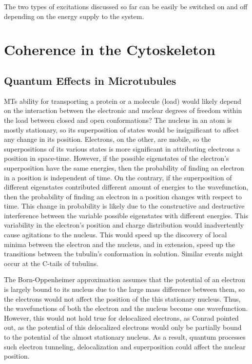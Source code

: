 \documentclass[letterpaper,final,times]{cas-dc}
\numberwithin{equation}{section}
\begin{document}
The two types of excitations discussed so far can be easily be switched on and off depending on the energy supply to the system.

\section{Coherence in the Cytoskeleton}
\subsection{Quantum Effects in Microtubules}
MTs ability for transporting a protein or a molecule (load) would likely depend on the interaction between the electronic and nuclear degrees of freedom within the load between closed and open conformations? The nucleus in an atom is mostly stationary, so its superposition of states would be insignificant to affect any change in its position. Electrons, on the other, are mobile, so the superpositions of its various states is more significant in
attributing electrons a position in space-time\citep{35}. However, if the possible eigenstates of the electron’s superposition have the same energies, then the probability of finding an electron in a position is independent of time\citep{38}. On the contrary, if the superposition of different eigenstates contributed different amount of energies to the wavefunction, then the probability of finding an electron in a position changes with respect to time. This change in probability is likely due to the constructive and destructive interference between the variable possible eigenstates with different energies. This variability in the electron’s position and charge distribution would inadvertently cause agitations to the nucleus. This would speed up the discovery of local minima between the electron and the nucleus\citep{35}, and in extension, speed up the transitions between the tubulin’s conformation in solution. Similar events might occur at the C-tails of tubulins.

The Born-Oppenheimer approximation assumes that the potential of an electron is largely bound to its nucleus due to the large mass difference between them, so the electrons would not affect the position of the this stationary nucleus. Thus, the wavefunctions of both the electron and the nucleus become one wavefunction. However, this would not hold true for delocalized electrons, as Conrad pointed out\citep{35}, as the potential of this delocalized electrons would only be partially bound to the potential of the almost stationary nucleus. As a result, quantum processes such electron tunneling, delocalization and superposition could affect the nuclear position.
\end{document}
